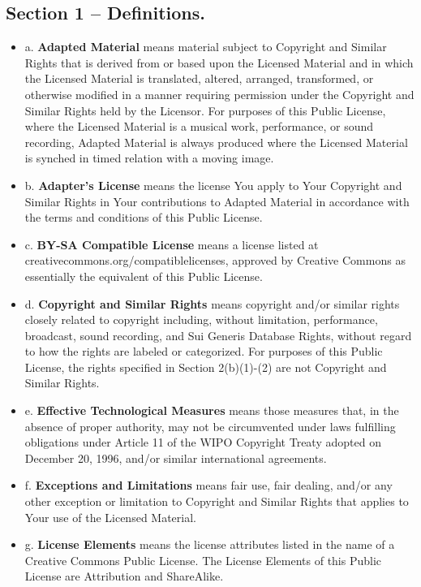 \subsection*{Section 1 – Definitions.}
	\begin{itemize}
		\item a. \textbf{Adapted Material} means material subject to Copyright and Similar Rights that is derived from or based upon the Licensed Material and in which the Licensed Material is translated, altered, arranged, transformed, or otherwise modified in a manner requiring permission under the Copyright and Similar Rights held by the Licensor. For purposes of this Public License, where the Licensed Material is a musical work, performance, or sound recording, Adapted Material is always produced where the Licensed Material is synched in timed relation with a moving image.
		\item b. \textbf{Adapter's License} means the license You apply to Your Copyright and Similar Rights in Your contributions to Adapted Material in accordance with the terms and conditions of this Public License.
		\item c. \textbf{BY-SA Compatible License} means a license listed at creativecommons.org/compatiblelicenses, approved by Creative Commons as essentially the equivalent of this Public License.
		\item d. \textbf{Copyright and Similar Rights} means copyright and/or similar rights closely related to copyright including, without limitation, performance, broadcast, sound recording, and Sui Generis Database Rights, without regard to how the rights are labeled or categorized. For purposes of this Public License, the rights specified in Section 2(b)(1)-(2) are not Copyright and Similar Rights.
		\item e. \textbf{Effective Technological Measures} means those measures that, in the absence of proper authority, may not be circumvented under laws fulfilling obligations under Article 11 of the WIPO Copyright Treaty adopted on December 20, 1996, and/or similar international agreements.
		\item f. \textbf{Exceptions and Limitations} means fair use, fair dealing, and/or any other exception or limitation to Copyright and Similar Rights that applies to Your use of the Licensed Material.
		\item g. \textbf{License Elements} means the license attributes listed in the name of a Creative Commons Public License. The License Elements of this Public License are Attribution and ShareAlike.

\end{itemize}
